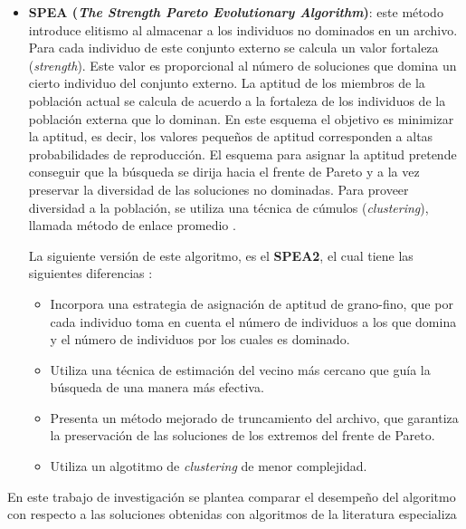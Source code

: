 \begin{itemize}
\begin{itemize}
    \item \textbf{SPEA (\textit{The Strength Pareto Evolutionary Algorithm})}: este m\'etodo introduce elitismo al almacenar a los
    individuos no dominados en un archivo. Para cada individuo de este conjunto externo se calcula un valor \DIFdelbegin {}\DIFdelend \DIFaddbegin {}\DIFaddend fortaleza 
    (\textit{strength}). Este valor es proporcional al n\'umero de soluciones que domina un cierto individuo del conjunto externo.
    La aptitud de los miembros de la poblaci\'on actual se calcula de acuerdo a la fortaleza de los individuos de la poblaci\'on
    externa que lo dominan. En este esquema el objetivo es minimizar la aptitud, es decir, los valores peque\~nos de aptitud corresponden 
    a altas probabilidades \DIFaddbegin {}\DIFaddend de reproducci\'on. El esquema para asignar la aptitud pretende conseguir que la b\'usqueda 
    se dirija hacia el frente de Pareto y a la vez preservar la diversidad de las soluciones no dominadas. Para proveer 
    diversidad a la poblaci\'on, se utiliza una t\'ecnica de c\'umulos (\textit{clustering}), llamada m\'etodo de enlace 
    promedio \cite{Zitzler99}. 

    La siguiente versi\'on de este algoritmo, es el \textbf{SPEA2}, el cual tiene las siguientes diferencias \cite{zlt2002a}:

    \begin{itemize}
     \item Incorpora una estrategia de asignaci\'on de aptitud de grano-fino, que por cada individuo toma en cuenta
     el n\'umero de individuos a los que domina y el n\'umero de individuos por los cuales es dominado.
     \item Utiliza una t\'ecnica de estimaci\'on del vecino m\'as cercano que gu\'ia  la b\'usqueda de una manera
     m\'as efectiva.
     \item Presenta un m\'etodo mejorado de truncamiento del archivo, que garantiza  la preservaci\'on de las 
     soluciones de los extremos del frente de Pareto.
     \item Utiliza un algotitmo de \textit{clustering} de menor complejidad.
    \end{itemize}    
   \end{itemize}
\end{itemize}

  En este trabajo de investigaci\'on se plantea comparar el desempe\~no del algoritmo \DIFdelbegin {}\DIFdelend con respecto a las soluciones obtenidas con 
  \DIFdelbegin {}\DIFdelend \DIFaddbegin {}\DIFaddend algoritmos de la literatura especializa\DIFdelbegin \DIFdel{:
  }\DIFdelend \DIFaddbegin {}\DIFaddend 

